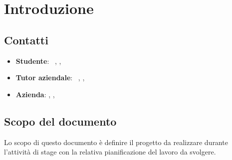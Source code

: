 \section{Introduzione}
\subsection{Contatti}
\begin{itemize}
	\item \textbf{Studente}: \nomeStudente\ \cognomeStudente, \href{mailto:\emailStudente}{\emailStudente}, \telStudente \\
	\item \textbf{Tutor aziendale}: \nomeTutorAziendale\ \cognomeTutorAziendale, \href{mailto:\emailTutorAziendale}{\emailTutorAziendale}, \telTutorAziendale \\
	\item \textbf{Azienda}: \ragioneSocAzienda, \indirizzoAzienda, \href{\sitoAzienda}{\sitoAzienda}
		
\end{itemize}
\subsection{Scopo del documento}
Lo scopo di questo documento è definire il progetto da realizzare durante l'attività di stage con la relativa pianificazione del lavoro da svolgere. 